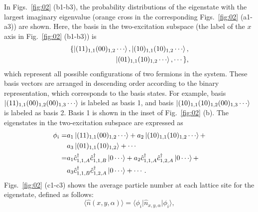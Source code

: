 \documentclass[longbibliography, aps, prx, amsmath, amssymb, amsfonts, twocolumn,superscriptaddress, footinbib]{revtex4-1}
\begin{document}
	In Figs.~\ref{fig:02} (b1-b3), the probability distributions of the eigenstate with the largest imaginary eigenvalue (orange cross in the corresponding Figs.~\ref{fig:02} (a1-a3)) are shown. Here, the  
	basis in the two-excitation subspace (the label of the $x$ axis in Fig.~\ref{fig:02} (b1-b3)) is
	\begin{equation}
		\begin{split}
			\{\ket{(11)_{1,1}(00)_{1,2}\cdots}, \ket{(10)_{1,1}(10)_{1,2}\cdots}, \\
			\ket{(01)_{1,1}(10)_{1,2}\cdots},\cdots\},
		\end{split}
	\end{equation}
	which represent all possible configurations of two fermions in the system. These basis vectors are arranged in descending order according to the binary representation, which corresponds to the basis states.
	For example, basis $\ket{(11)_{1,1}(00)_{1,2}(00)_{1,3}\cdots}$ is labeled as basis 1, and basis $\ket{(10)_{1,1}(10)_{1,2}(00)_{1,3}\cdots}$ is labeled as basis 2. 
	Basis 1 is shown in the inset of Fig.~\ref{fig:02} (b). The eigenstates in the two-excitation subspace are expressed as 
	\begin{equation}
		\begin{split}
			\phi_i =& a_1 \ket{(11)_{1,1}(00)_{1,2}\cdots} + a_2 \ket{(10)_{1,1}(10)_{1,2}\cdots} + \\
			&a_3 \ket{(01)_{1,1}(10)_{1,2}} + \cdots\\
			=& a_1 \hat{c}_{1,1,A}^{\dagger}\hat{c}_{1,1,B}^{\dagger} \ket{0\cdots} + a_2 \hat{c}_{1,1,A}^{\dagger}\hat{c}_{1,2,A}^{\dagger} \ket{0\cdots} + \\
			& a_3 \hat{c}_{1,1,B}^{\dagger}\hat{c}_{1,2,A}^{\dagger} \ket{0\cdots} + \cdots.
		\end{split}
	\end{equation}
	Figs.~\ref{fig:02} (c1-c3) shows the average particle number at each lattice site for the eigenstate, defined as follows:
	\begin{equation}
		\langle \hat{n}(x,y,\alpha) \rangle = \langle \phi_i \vert \hat{n}_{x,y,\alpha} \vert \phi_i \rangle,
	\end{equation}
\end{document}
